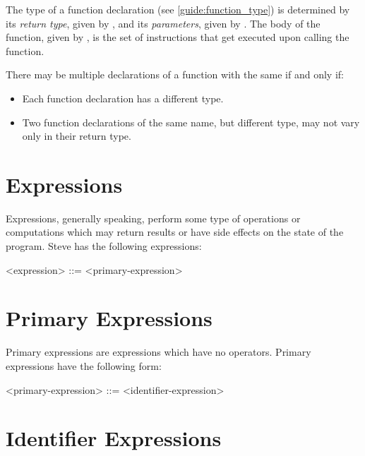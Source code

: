 The type of a function declaration (see \ref{guide:function_type}) is determined by its \textit{return type}, given by , and its \textit{parameters}, given by . The body of the function, given by , is the set of instructions that get executed upon calling the function.

There may be multiple declarations of a function with the same  if and only if:

\begin{itemize}
\item Each function declaration has a different type.
\item Two function declarations of the same name, but different type, may not vary only in their return type.
\end{itemize} 

\section{Expressions} \label{guide:expr}

Expressions, generally speaking, perform some type of operations or computations which may return results or have side effects on the state of the program. Steve has the following expressions:

\begin{minip}
\begin{grammar}
<expression> ::=
<primary-expression>
\end{grammar}
\end{minip}

\section{Primary Expressions} \label{guide:primary_expr}

Primary expressions are expressions which have no operators. Primary expressions have the following form:

\begin{minip}
\begin{grammar}
<primary-expression> ::= 
<identifier-expression>
\end{grammar}
\end{minip}

\section{Identifier Expressions} \label{guide:id_expr}

